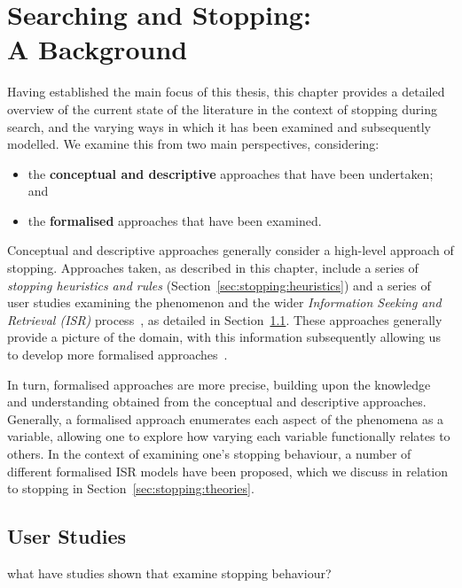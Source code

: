 
\chapter[Searching and Stopping]{Searching and Stopping:\\A Background}
\label{chap:stopping}
Having established the main focus of this thesis, this chapter provides a detailed overview of the current state of the literature in the context of stopping during search, and the varying ways in which it has been examined and subsequently modelled. We examine this from two main perspectives, considering:

\begin{itemize}
    \item{the \textbf{conceptual and descriptive} approaches that have been undertaken; and}
    \item{the \textbf{formalised} approaches that have been examined.}
\end{itemize}

Conceptual and descriptive approaches generally consider a high-level approach of stopping. Approaches taken, as described in this chapter, include a series of \emph{stopping heuristics and rules} (Section~\ref{sec:stopping:heuristics}) and a series of user studies examining the phenomenon and the wider \emph{Information Seeking and Retrieval (ISR)} process~\citep{kelly2013evaluation_review}, as detailed in Section~\ref{sec:stopping:studies}. These approaches generally provide a picture of the domain, with this information subsequently allowing us to develop more formalised approaches~\citep{azzopardi2015theories}.

In turn, formalised approaches are more precise, building upon the knowledge and understanding obtained from the conceptual and descriptive approaches. Generally, a formalised approach enumerates each aspect of the phenomena as a variable, allowing one to explore how varying each variable functionally relates to others. In the context of examining one's stopping behaviour, a number of different formalised ISR models have been proposed, which we discuss in relation to stopping in Section~\ref{sec:stopping:theories}.

\section{User Studies}\label{sec:stopping:studies}
what have studies shown that examine stopping behaviour?

